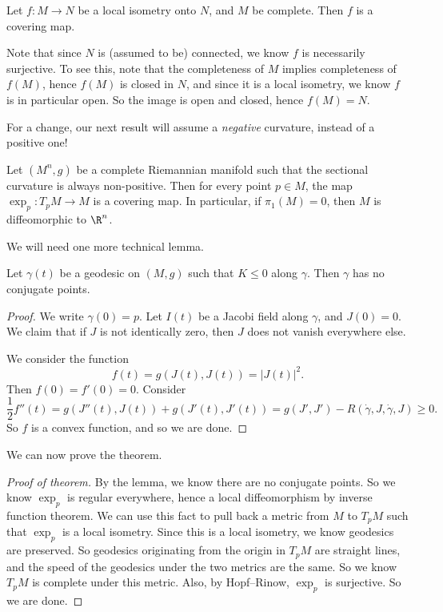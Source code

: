 \documentclass[a4paper]{article}
\begin{document}
\begin{cor}
  Let $f: M \to N$ be a local isometry onto $N$, and $M$ be complete. Then $f$ is a covering map.
\end{cor}
Note that since $N$ is (assumed to be) connected, we know $f$ is necessarily surjective. To see this, note that the completeness of $M$ implies completeness of $f(M)$, hence $f(M)$ is closed in $N$, and since it is a local isometry, we know $f$ is in particular open. So the image is open and closed, hence $f(M) = N$.

For a change, our next result will assume a \emph{negative} curvature, instead of a positive one!
\begin{thm}
  Let $(M^n, g)$ be a complete Riemannian manifold such that the sectional curvature is always non-positive. Then for every point $p \in M$, the map $\exp_p: T_p M \to M$ is a covering map. In particular, if $\pi_1(M) = 0$, then $M$ is diffeomorphic to $\R^n$.
\end{thm}

We will need one more technical lemma.
\begin{lemma}
  Let $\gamma(t)$ be a geodesic on $(M, g)$ such that $K \leq 0$ along $\gamma$. Then $\gamma$ has no conjugate points.
\end{lemma}

\begin{proof}
  We write $\gamma(0) = p$. Let $I(t)$ be a Jacobi field along $\gamma$, and $J(0) = 0$. We claim that if $J$ is not identically zero, then $J$ does not vanish everywhere else.

  We consider the function
  \[
    f(t) = g(J(t), J(t)) = |J(t)|^2.
  \]
  Then $f(0) = f'(0) = 0$. Consider
  \[
    \frac{1}{2} f''(t) = g(J''(t), J(t)) + g(J'(t), J'(t)) = g(J', J') - R(\dot{\gamma}, J, \dot{\gamma}, J) \geq 0.
  \]
  So $f$ is a convex function, and so we are done.
\end{proof}

We can now prove the theorem.
\begin{proof}[Proof of theorem]
  By the lemma, we know there are no conjugate points. So we know $\exp_p$ is regular everywhere, hence a local diffeomorphism by inverse function theorem. We can use this fact to pull back a metric from $M$ to $T_p M$ such that $\exp_p$ is a local isometry. Since this is a local isometry, we know geodesics are preserved. So geodesics originating from the origin in $T_p M$ are straight lines, and the speed of the geodesics under the two metrics are the same. So we know $T_p M$ is complete under this metric. Also, by Hopf--Rinow, $\exp_p$ is surjective. So we are done.
\end{proof}
\end{document}
